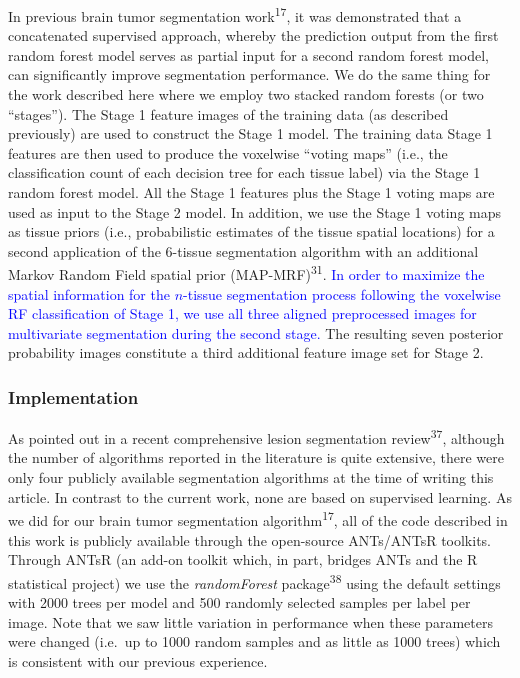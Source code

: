 \documentclass[11pt,]{article}
\begin{document}
In previous brain tumor segmentation work\textsuperscript{17}, it was
demonstrated that a concatenated supervised approach, whereby the
prediction output from the first random forest model serves as partial
input for a second random forest model, can significantly improve
segmentation performance. We do the same thing for the work described
here where we employ two stacked random forests (or two ``stages''). The
Stage 1 feature images of the training data (as described previously)
are used to construct the Stage 1 model. The training data Stage 1
features are then used to produce the voxelwise ``voting maps'' (i.e.,
the classification count of each decision tree for each tissue label)
via the Stage 1 random forest model. All the Stage 1 features plus the
Stage 1 voting maps are used as input to the Stage 2 model. In addition,
we use the Stage 1 voting maps as tissue priors (i.e., probabilistic
estimates of the tissue spatial locations) for a second application of
the \(6\)-tissue segmentation algorithm with an additional Markov Random
Field spatial prior (MAP-MRF)\textsuperscript{31}.
\textcolor{blue}{In order to maximize the spatial information for the $n$-tissue segmentation process following the voxelwise RF classification of Stage 1, we use
all three aligned preprocessed images for multivariate segmentation during the
second stage.} The resulting seven posterior probability images
constitute a third additional feature image set for Stage 2.

\subsubsection{Implementation}\label{implementation}

As pointed out in a recent comprehensive lesion segmentation
review\textsuperscript{37}, although the number of algorithms reported
in the literature is quite extensive, there were only four publicly
available segmentation algorithms at the time of writing this article.
In contrast to the current work, none are based on supervised learning.
As we did for our brain tumor segmentation
algorithm\textsuperscript{17}, all of the code described in this work is
publicly available through the open-source ANTs/ANTsR toolkits. Through
ANTsR (an add-on toolkit which, in part, bridges ANTs and the R
statistical project) we use the \emph{randomForest}
package\textsuperscript{38} using the default settings with 2000 trees
per model and 500 randomly selected samples per label per image. Note
that we saw little variation in performance when these parameters were
changed (i.e.~up to 1000 random samples and as little as 1000 trees)
which is consistent with our previous experience.
\end{document}

